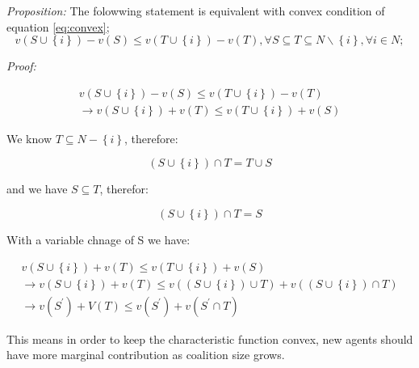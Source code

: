 \documentclass[10pt, conference, compsocconf]{IEEEtran}
\theoremstyle{plain}
\theoremstyle{definition}
\begin{document}
\emph{Proposition: } The folowwing statement is equivalent with convex condition of equation \ref{eq:convex}; 
\begin{equation}\label{eq:convex_snow}
v(S \cup \left\{i\right\}) - v(S) \leq v (T \cup \left\{i\right\}) - v(T), \forall S \subseteq T \subseteq N \backslash \left\{i\right\}, \forall i \in N; 
\end{equation}

\emph{Proof: } 

\begin{gather*}\label{convexsnowproof}
v(S \cup \left\{i\right\}) - v(S) \leq v (T \cup \left\{i\right\}) - v(T)
\\
\rightarrow v(S \cup \left\{i\right\}) + v(T) \leq v (T \cup \left\{i\right\}) + v(S)
\end{gather*}

We know $T \subseteq N - \left\{i\right\}$, therefore:

\begin{equation*}
(S \cup \left\{i\right\}) \cap T = T \cup S
\end{equation*}

and we have $S \subseteq T$, therefor:

\begin{equation*}
(S \cup \left\{i\right\}) \cap T = S
\end{equation*}

With a variable chnage of S we have:

\begin{gather*}
v(S \cup \left\{i\right\}) + v(T) \leq v (T \cup \left\{i\right\}) + v(S)
\\
\rightarrow v(S \cup \left\{i\right\}) + v(T) \leq v((S \cup \left\{i\right\}) \cup T) + v((S \cup \left\{i\right\}) \cap T)
\\
\rightarrow v(S^\prime) + V(T) \leq v(S^\prime) + v(S^\prime \cap T)
\end{gather*}

This means in order to keep the characteristic function convex, new agents should have more marginal contribution as coalition size grows.
\end{document}
